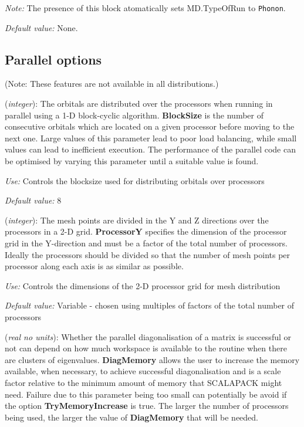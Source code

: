 \documentclass[11pt]{article}
\begin{document}
\begin{description}
\begin{verbatim}
\end{verbatim}

{\it Note:} The presence of this block 
atomatically sets MD.TypeOfRun to {\tt Phonon}.
 
{\it Default value:} None.

\end{description}


\vspace{5pt}
\subsection{Parallel options}

(Note: These features are not available in all distributions.)

\begin{description}
\itemsep 10pt
\parsep 0pt

\item[{\bf BlockSize}] ({\it integer}):  The orbitals are distributed over the processors when
running in parallel using a 1-D block-cyclic algorithm. {\bf
BlockSize} is the number of consecutive orbitals which are located on
a given processor before moving to the next one. Large values of this
parameter lead to poor load balancing, while small values can lead to
inefficient execution.  The performance of the parallel code can be
optimised by varying this parameter until a suitable value is found.

{\it Use:} Controls the blocksize used for distributing orbitals over
processors

{\it Default value:}  8

\item[{\bf ProcessorY}] ({\it integer}):  The mesh points are divided in the Y and Z directions
over the processors in a 2-D grid. {\bf ProcessorY} specifies the
dimension of the processor grid in the Y-direction and must be a
factor of the total number of processors. Ideally the processors
should be divided so that the number of mesh points per processor
along each axis is as similar as possible.

{\it Use:} Controls the dimensions of the 2-D processor grid for mesh
distribution

{\it Default value:} Variable - chosen using multiples of factors of
  the total number of processors

\item[{\bf DiagMemory}] ({\it real no units}):
Whether the parallel diagonalisation of a matrix is successful or not can 
depend on how much workspace is available to the routine when there are
clusters of eigenvalues. {\bf DiagMemory} allows the user to increase
the memory available, when necessary, to achieve successful diagonalisation
and is a scale factor relative to the minimum amount of memory that
SCALAPACK might need. Failure due to this parameter being too small
can potentially be avoid if the option {\bf TryMemoryIncrease} is true.
The larger the number of processors being used, the larger the value of
{\bf DiagMemory} that will be needed.


\end{description}
\end{document}
